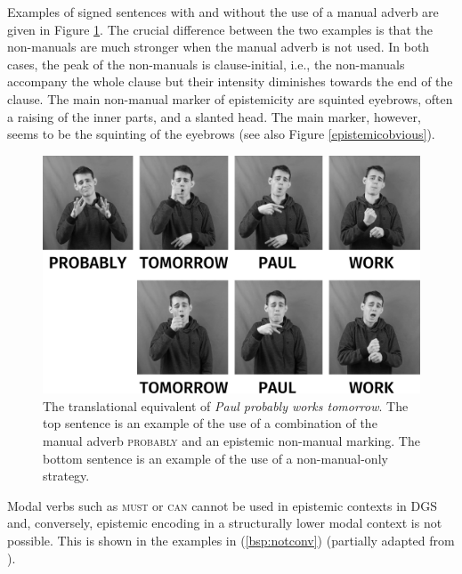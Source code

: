 Examples of signed sentences with and without the use of a manual adverb are given in Figure \ref{probablynmmmanual}. The crucial difference between the two examples is that the non-manuals are much stronger when the manual adverb is not used. In both cases, the peak of the non-manuals is clause-initial, i.e., the non-manuals accompany the whole clause but their intensity diminishes towards the end of the clause. The main non-manual marker of epistemicity are squinted eyebrows, often a raising of the inner parts, and a slanted head. The main marker, however, seems to be the squinting of the eyebrows (see also Figure \ref{epistemicobvious}).


\begin{figure}[bt]
\centering
	\includegraphics[width=1.0\textwidth]{probablysw.jpg}
	\caption{The translational equivalent of \textit{Paul probably works tomorrow}. The top sentence is an example of the use of a combination of the manual adverb \textsc{probably} and an epistemic non-manual marking. The bottom sentence is an example of the use of a non-manual-only strategy.}
	\label{probablynmmmanual}
\end{figure}

Modal verbs such as \textsc{must} or \textsc{can} cannot be used in epistemic contexts in DGS \citep[112]{herrmann2013modal} and, conversely, epistemic encoding in a structurally lower modal context is not possible. This is shown in the examples in (\ref{bsp:notconv}) (partially adapted from \citealt{bross2017scope}). 

